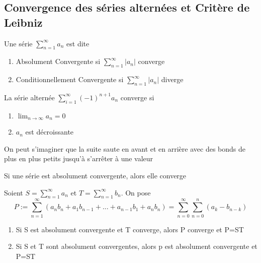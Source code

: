 \documentclass{article}
\begin{document}
\begin{theorem}

\end{theorem}

\subsection{Convergence des séries alternées et Critère de Leibniz}

\begin{definition}
    Une série $\sum_{n=1}^{\infty} a_n$ est dite
    \begin{enumerate}
	\item Absolument Convergente si $\sum_{n=1}^{\infty} |a_n| $
	    converge
	\item Conditionnellement Convergente si $\sum_{n=1}^{\infty} |a_n|$
	    diverge
    \end{enumerate}
\end{definition}

\begin{theorem}
    La série alternée $ \sum^{\infty}_{i=1} (-1)^{n+1} a_n $ converge si
    \begin{enumerate}
	\item $ \lim_{n \to \infty} a_n = 0 $
	\item $ {a_n} $ est décroissante
    \end{enumerate}
\end{theorem}

\begin{intuition}
    On peut s'imaginer que la suite saute en avant et en arrière avec des
    bonds de plus en plus petits jusqu'à s'arrêter à une valeur
\end{intuition}

\begin{theorem}
    Si une série est absolument convergente, alors elle converge
\end{theorem}

\begin{theorem}
    Soient $S = \sum_{n=1}^{\infty} a_n$ et $T = \sum_{n=1}^{\infty} b_n$.
    On pose $$ P:= \sum_{n=1}^{\infty} (a_n b_n + a_1 b_{n-1} + ... +
    a_{n-1} b_1 + a_n b_n) = \sum_{n=0}^{\infty} \sum_{n=0}^{n}
    (a_k - b_{n-k})$$
    \begin{enumerate}
	\item Si S est absolument convergente et T converge, alors P
	    converge et P=ST
	\item Si S et T sont absolument convergentes, alors p est
	    absolument convergente et P=ST
    \end{enumerate}
\end{theorem}
\end{document}
